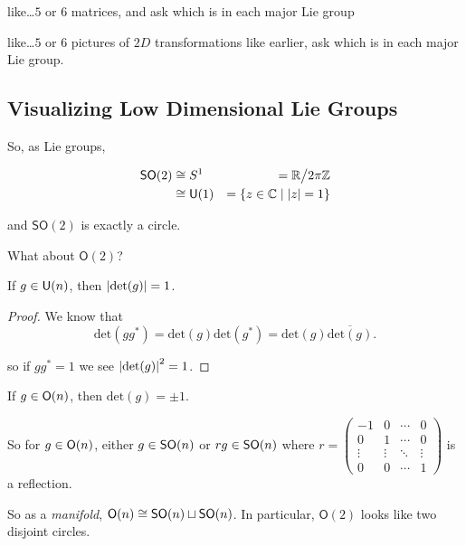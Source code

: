 \documentclass[../main.tex]{subfiles}
\begin{document}
\begin{ExerciseList}
  \Exercise like\ldots $5$ or $6$ matrices, and ask which is in each major Lie group

  \Exercise like\ldots $5$ or $6$ pictures of $2D$ transformations like earlier,
  ask which is in each major Lie group.
\end{ExerciseList}

\subsection{Visualizing Low Dimensional Lie Groups}

So, as Lie groups, 

\begin{align*}
  \mathsf{SO}(2) &\cong S^1           &= \mathbb{R} \big / 2\pi \mathbb{Z}  \\
                 &\cong \mathsf{U}(1) &= \{ z \in \mathbb{C} \mid |z| = 1 \}
\end{align*}

and $\mathsf{SO}(2)$ is exactly a circle.

What about $\mathsf{O}(2)$?

\begin{lemma}
  If $g \in \mathsf{U}(n)$, then $\left \lvert \text{det}(g) \right \rvert = 1$.
\end{lemma}

\begin{proof}
  We know that 
  \[ 
    \text{det}(g g^*) 
    = \text{det}(g) \text{det}(g^*) 
    = \text{det}(g) \overline{\text{det}(g)}.
  \]

  so if $gg^* = 1$ we see $\left \lvert \text{det}(g) \right \rvert^2 = 1$.
\end{proof}

\begin{cor}
  If $g \in \mathsf{O}(n)$, then $\text{det}(g) = \pm 1$.
\end{cor}

So for $g \in \mathsf{O}(n)$, either $g \in \mathsf{SO}(n)$ or $rg \in \mathsf{SO}(n)$ where
$r = \begin{pmatrix} -1  & 0 & \cdots & 0 \\ 0 & 1 & \cdots & 0 \\ \vdots & \vdots & \ddots & \vdots \\ 0 & 0 & \cdots & 1 \end{pmatrix}$
is a reflection. 

So as a \emph{manifold}, $\mathsf{O}(n) \cong \mathsf{SO}(n) \sqcup \mathsf{SO}(n)$. In particular,
$\mathsf{O}(2)$ looks like two disjoint circles.
\end{document}
